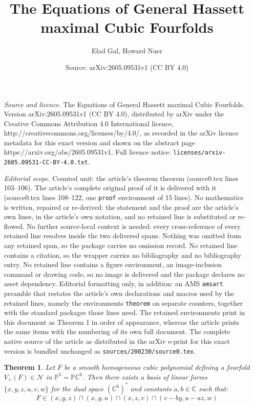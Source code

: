 \documentclass[10pt,a4paper]{amsart}
\title{The Equations of General Hassett maximal Cubic Fourfolds}
\author{Elad Gal, Howard Nuer}
\date{Source: arXiv:2605.09531v1 (CC BY 4.0)}
\newtheorem{theorem}{Theorem}
\begin{document}
\maketitle

\noindent\emph{Source and licence.} The Equations of General Hassett maximal Cubic Fourfolds. Version arXiv:2605.09531v1 (CC BY 4.0), distributed by arXiv under the Creative Commons Attribution 4.0 International licence, http://creativecommons.org/licenses/by/4.0/, as recorded in the arXiv licence metadata for this exact version and shown on the abstract page https://arxiv.org/abs/2605.09531v1. Full licence notice: \texttt{licenses/arxiv-2605.09531-CC-BY-4.0.txt}.\par\smallskip

\noindent\textit{Editorial scope.} Counted unit: the article's theorem theorem (source0.tex lines 103--106). The article's complete original proof of it is delivered with it (source0.tex lines 108--122, one \texttt{proof} environment of 15 lines). No mathematics is written, repaired or re-derived: the statement and the proof are the article's own lines, in the article's own notation, and no retained line is substituted or re-flowed.  No further source-local context is needed: every cross-reference of every retained line resolves inside the two delivered spans.  Nothing was omitted from any retained span, so the package carries no omission record.  No retained line contains a citation, so the wrapper carries no bibliography and no bibliography entry.  No retained line contains a figure environment, an image-inclusion command or drawing code, so no image is delivered and the package declares no asset dependency.  Editorial formatting only, in addition: an AMS \texttt{amsart} preamble that restates the article's own declarations and macros used by the retained lines, namely the environments \texttt{theorem} on separate counters, together with the standard packages those lines need.  The retained environments print in this document as Theorem 1 in order of appearance, whereas the article prints the same items with the numbering of its own full document.  The complete native source of the article as distributed in the arXiv e-print for this exact version is bundled unchanged as \texttt{sources/200230/source0.tex}.
\begin{theorem}
Let $F$ be a smooth homogeneous cubic polynomial defining a fourfold $V_+(F) \in \mathcal{N}$ in $\mathbb{P}^5 = \mathbb{P}\mathbb{C}^6$. Then there exists a basis of linear forms $\{x,y,z,u,v,w\}$ for the dual space $(\mathbb{C}^6)^*$ and constants $a,b \in \mathbb{C}$ such that:
$$F \in ( x,y,z ) \cap ( x,y,u ) \cap ( x,z,v ) \cap ( v-by,u-az,w )$$
\end{theorem}
\end{document}
